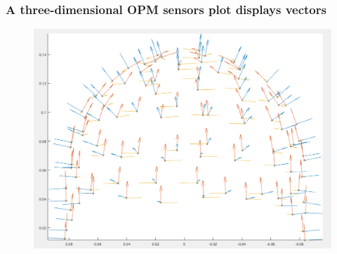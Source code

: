 \documentclass{beamer}
\numberwithin{figure}{section}
\numberwithin{equation}{section}
\begin{document}
\section{}
\begin{frame}
 \frametitle{A three-dimensional OPM sensors plot displays vectors}
	\begin{figure}[p]
  		\centering
  		\includegraphics[width=0.6\linewidth]{pictures/opmvect}
  		\label{fig:approaches_RDF}
 	\end{figure}

  
\end{frame}
\end{document}
